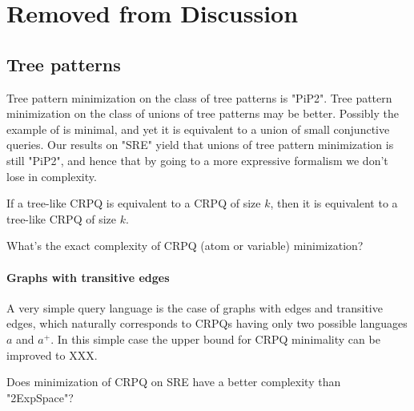 


\section{Removed from Discussion}
\subsection{Tree patterns} Tree pattern minimization on the class of tree patterns is "PiP2". Tree pattern minimization on the class of unions of tree patterns may be better. Possibly the example of \cite[Fig.~9]{CzerwinskiMartensNiewerthParys2018Minimization} is minimal, and yet it is equivalent to a union of small conjunctive queries.
Our results on "SRE" yield that unions of tree pattern minimization is still "PiP2", and hence that by going to a more expressive formalism we don't lose in complexity.

\begin{conjecture}
If a tree-like CRPQ is equivalent to a CRPQ of size $k$, then it is equivalent to a tree-like CRPQ of size $k$.
\end{conjecture}



\begin{openproblem}
    What's the exact complexity of CRPQ (atom or variable) minimization?
\end{openproblem}

\paragraph{Graphs with transitive edges} A very simple query language is the case of graphs with edges and transitive edges, which naturally corresponds to CRPQs having only two possible languages $a$ and $a^+$. In this simple case the upper bound for CRPQ minimality can be improved to XXX.

\begin{openproblem}
    Does minimization of CRPQ on SRE have a better complexity than "2ExpSpace"?
\end{openproblem}
